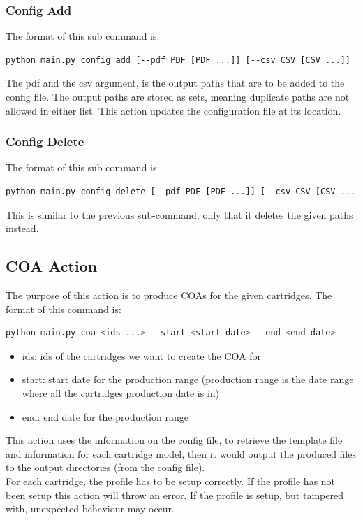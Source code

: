 \documentclass[12pt,a4paper]{article}
\begin{document}
\subsubsection{Config Add}
The format of this sub command is:
\begin{lstlisting}[language=bash]
  python main.py config add [--pdf PDF [PDF ...]] [--csv CSV [CSV ...]]
\end{lstlisting}
The pdf and the csv argument, is the output paths that are to be added to the config file. The output paths are stored as sets, meaning
duplicate paths are not allowed in either list. This action updates the configuration file at its location.
\subsubsection{Config Delete}
The format of this sub command is:
\begin{lstlisting}[language=bash]
  python main.py config delete [--pdf PDF [PDF ...]] [--csv CSV [CSV ...]]
\end{lstlisting}
This is similar to the previous sub-command, only that it deletes the given paths instead. 

\subsection{COA Action}
The purpose of this action is to produce COAs for the given cartridges. The format of this command is:
\begin{lstlisting}[language=bash]
  python main.py coa <ids ...> --start <start-date> --end <end-date>
\end{lstlisting}
\begin{itemize}
  \item ids: ids of the cartridges we want to create the COA for
  \item start: start date for the production range (production range is the date range where all the cartridges production date is in)
  \item end: end date for the production range
\end{itemize}
This action uses the information on the config file, to retrieve the template file and information for each cartridge model, then it would output
the produced files to the output directories (from the config file). \\
For each cartridge, the profile has to be setup correctly. If the profile has not been setup this action will throw an error. If the profile is setup,
but tampered with, unexpected behaviour may occur. \\
\end{document}
